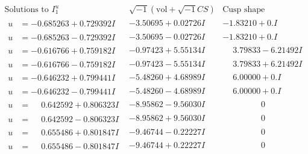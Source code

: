 \documentclass[1p]{elsarticle_modified}
\theoremstyle{definition}
\newcommand{\I}{\sqrt{-1}}
\begin{document}
$$\begin{array}{c|c|c}  
\text{Solutions to }I^u_{1}& \I (\text{vol} + \sqrt{-1}CS) & \text{Cusp shape}\\
 \hline 
\begin{aligned}
u &= -0.685263 + 0.729392 I\end{aligned}
 & -3.50695 + 0.02726 I & -1.83210 + 0. I\phantom{ +0.000000I} \\ \hline\begin{aligned}
u &= -0.685263 - 0.729392 I\end{aligned}
 & -3.50695 - 0.02726 I & -1.83210 + 0. I\phantom{ +0.000000I} \\ \hline\begin{aligned}
u &= -0.616766 + 0.759182 I\end{aligned}
 & -0.97423 + 5.55134 I & \phantom{-}3.79833 - 6.21492 I \\ \hline\begin{aligned}
u &= -0.616766 - 0.759182 I\end{aligned}
 & -0.97423 - 5.55134 I & \phantom{-}3.79833 + 6.21492 I \\ \hline\begin{aligned}
u &= -0.646232 + 0.799441 I\end{aligned}
 & -5.48260 + 4.68989 I & \phantom{-}6.00000 + 0. I\phantom{ +0.000000I} \\ \hline\begin{aligned}
u &= -0.646232 - 0.799441 I\end{aligned}
 & -5.48260 - 4.68989 I & \phantom{-}6.00000 + 0. I\phantom{ +0.000000I} \\ \hline\begin{aligned}
u &= \phantom{-}0.642592 + 0.806323 I\end{aligned}
 & -8.95862 - 9.56030 I & \phantom{-0.000000 } 0 \\ \hline\begin{aligned}
u &= \phantom{-}0.642592 - 0.806323 I\end{aligned}
 & -8.95862 + 9.56030 I & \phantom{-0.000000 } 0 \\ \hline\begin{aligned}
u &= \phantom{-}0.655486 + 0.801847 I\end{aligned}
 & -9.46744 - 0.22227 I & \phantom{-0.000000 } 0 \\ \hline\begin{aligned}
u &= \phantom{-}0.655486 - 0.801847 I\end{aligned}
 & -9.46744 + 0.22227 I & \phantom{-0.000000 } 0 \\ \hline\begin{aligned}

\end{aligned}
\end{array}$$
\end{document}
